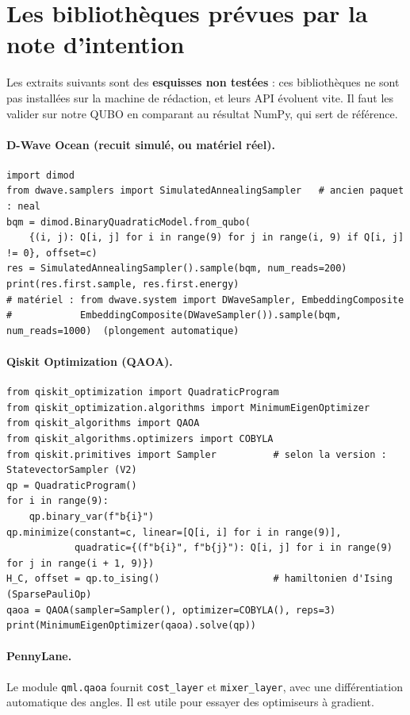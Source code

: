 \section{Les bibliothèques prévues par la note d'intention}
Les extraits suivants sont des \textbf{esquisses non testées} : ces bibliothèques ne sont pas installées sur la machine de rédaction, et leurs API évoluent vite. Il faut les valider sur notre QUBO en comparant au résultat NumPy, qui sert de référence.

\paragraph{D-Wave Ocean (recuit simulé, ou matériel réel).}
\begin{lstlisting}
import dimod
from dwave.samplers import SimulatedAnnealingSampler   # ancien paquet : neal
bqm = dimod.BinaryQuadraticModel.from_qubo(
    {(i, j): Q[i, j] for i in range(9) for j in range(i, 9) if Q[i, j] != 0}, offset=c)
res = SimulatedAnnealingSampler().sample(bqm, num_reads=200)
print(res.first.sample, res.first.energy)
# matériel : from dwave.system import DWaveSampler, EmbeddingComposite
#            EmbeddingComposite(DWaveSampler()).sample(bqm, num_reads=1000)  (plongement automatique)
\end{lstlisting}

\paragraph{Qiskit Optimization (QAOA).}
\begin{lstlisting}
from qiskit_optimization import QuadraticProgram
from qiskit_optimization.algorithms import MinimumEigenOptimizer
from qiskit_algorithms import QAOA
from qiskit_algorithms.optimizers import COBYLA
from qiskit.primitives import Sampler          # selon la version : StatevectorSampler (V2)
qp = QuadraticProgram()
for i in range(9):
    qp.binary_var(f"b{i}")
qp.minimize(constant=c, linear=[Q[i, i] for i in range(9)],
            quadratic={(f"b{i}", f"b{j}"): Q[i, j] for i in range(9) for j in range(i + 1, 9)})
H_C, offset = qp.to_ising()                    # hamiltonien d'Ising (SparsePauliOp)
qaoa = QAOA(sampler=Sampler(), optimizer=COBYLA(), reps=3)
print(MinimumEigenOptimizer(qaoa).solve(qp))
\end{lstlisting}

\paragraph{PennyLane.} Le module \texttt{qml.qaoa} fournit \texttt{cost\_layer} et \texttt{mixer\_layer}, avec une différentiation automatique des angles. Il est utile pour essayer des optimiseurs à gradient.

